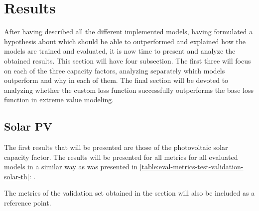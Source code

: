 \section{Results}
After having described all the different implemented models, having formulated a hypothesis about which should be able to outperformed and explained how the models are trained and evaluated, it is now time to present and analyze the obtained results. This section will have four subsection. The first three will focus on each of the three capacity factors, analyzing separately which models outperform and why in each of them. The final section will be devoted to analyzing whether the custom loss function successfully outperforms the base loss function in extreme value modeling. 
\subsection{Solar PV}
The first results that will be presented are those of the photovoltaic solar capacity factor. The results will be presented for all metrics for all evaluated models in a similar way as was presented in \autoref{table:eval-metrics-test-validation-solar-th}: .

The metrics of the validation set obtained in the  section will also be included as a reference point. 

